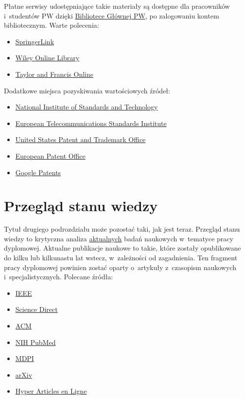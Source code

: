 Płatne serwisy udostępniające takie materiały są dostępne dla pracowników i~studentów PW dzięki \href{https://bg.pw.edu.pl/}{Bibliotece Głównej PW}, po zalogowaniu kontem bibliotecznym. Warte polecenia:

\begin{itemize}
	\item \href{http://eczyt.bg.pw.edu.pl/han/SpringerLink}{SpringerLink}
	\item \href{http://eczyt.bg.pw.edu.pl/han/Wiley}{Wiley Online Library}
	\item \href{http://eczyt.bg.pw.edu.pl/han/TaylorandFrancis}{Taylor and Francis Online}
\end{itemize}

Dodatkowe miejsca pozyskiwania wartościowych źródeł:

\begin{itemize}
	\item \href{https://www.nist.gov/}{National Institute of Standards and Technology}
	\item \href{https://www.etsi.org/}{European Telecommunications Standards Institute}
	\item \href{https://www.uspto.gov/}{United States Patent and Trademark Office}
	\item \href{https://www.epo.org/en}{European Patent Office}
	\item \href{https://patents.google.com/}{Google Patents}
\end{itemize}

\section{Przegląd stanu wiedzy}

Tytuł drugiego podrozdziału może pozostać taki, jak jest teraz. Przegląd stanu wiedzy to krytyczna analiza \underline{aktualnych} badań naukowych w~tematyce pracy dyplomowej. Aktualne publikacje naukowe to takie, które zostały opublikowane do kilku lub kilkunastu lat wstecz, w~zależności od zagadnienia. Ten fragment pracy dyplomowej powinien zostać oparty o~artykuły z~czasopism naukowych i~specjalistycznych. Polecane źródła:

\begin{itemize}
	\item \href{http://eczyt.bg.pw.edu.pl/han/ieee-import/}{IEEE}
	\item \href{http://eczyt.bg.pw.edu.pl/han/ScienceDirectOnLine}{Science Direct}
	\item \href{http://eczyt.bg.pw.edu.pl/han/ACMDigitalLibrary}{ACM}
	\item \href{https://pubmed.ncbi.nlm.nih.gov/}{NIH PubMed}
	\item \href{https://www.mdpi.com/}{MDPI}
	\item \href{https://arxiv.org/}{arXiv}
	\item \href{https://hal.science/}{Hyper Articles en Ligne}
\end{itemize}

